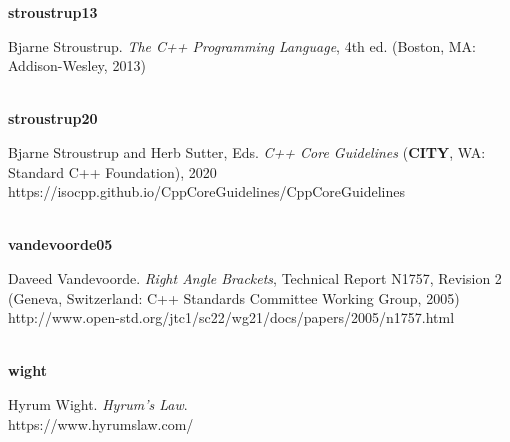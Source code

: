 \noindent\textbf{stroustrup13}\\
\hspace*{2em}\parbox[t]{\textwidth}{Bjarne Stroustrup. \textit{The C++ Programming Language}, 4th ed. (Boston, MA: Addison-Wesley, 2013)} \\

\noindent\textbf{stroustrup20}\\
\hspace*{2em}\parbox[t]{\textwidth}{Bjarne Stroustrup and Herb Sutter, Eds. \textit{C++ Core Guidelines} (\textbf{CITY}, WA: Standard C++ Foundation), 2020\\
https://isocpp.github.io/CppCoreGuidelines/CppCoreGuidelines} \\

\noindent\textbf{vandevoorde05}\\
\hspace*{2em}\parbox[t]{\textwidth}{Daveed Vandevoorde. \textit{Right Angle Brackets}, Technical Report N1757, Revision 2 (Geneva, Switzerland: C++ Standards Committee Working Group, 2005)\\
http://www.open-std.org/jtc1/sc22/wg21/docs/papers/2005/n1757.html}\\

\noindent\textbf{wight}\\
\hspace*{2em}\parbox[t]{\textwidth}{Hyrum Wight. \textit{Hyrum's Law}.\\
https://www.hyrumslaw.com/}\\




